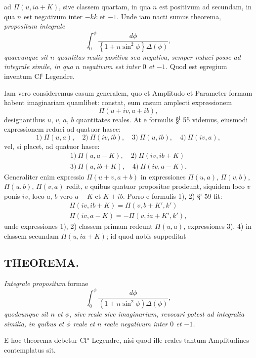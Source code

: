 \documentclass{article}
\begin{document}
ad $\Pi(u,ia+K)$, sive classem quartam, in qua $n$ est positivum ad secundam, in qua $n$ est negativum inter $-kk$ et $-1$. Unde iam nacti sumus theorema, \emph{propositum integrale}
\[
\int_{0}^{\phi}\frac{d\phi}{\left\{1+n\sin^{2}\phi\right\}\Delta(\phi)},
\]
\emph{quaecunque sit $n$ quantitas realis positiva seu negativa, semper reduci posse ad integrale simile, in quo $n$ negativum est inter $0$ et $-1$.} Quod est egregium inventum Cl$^{\mathrm{i}}$ Legendre.

Iam vero consideremus casum generalem, quo et Amplitudo et Parameter formam habent imaginariam quamlibet: constat, eum casum amplecti expressionem
\[
\Pi(u+iv,a+ib),
\]
designantibus $u$, $v$, $a$, $b$ quantitates reales. At e formulis §$^{\mathrm{i}}$ 55 videmus, eiusmodi expressionem reduci ad quatuor hasce:
\[
\text{1)}\ \Pi(u,a),\quad\text{2)}\ \Pi(iv,ib),\quad\text{3)}\ \Pi(u,ib),\quad\text{4)}\ \Pi(iv,a),
\]
vel, si placet, ad quatuor hasce:
\[
\begin{gathered}
\text{1)}\ \Pi(u,a-K),\quad\text{2)}\ \Pi(iv,ib+K)\\[1ex]
\text{3)}\ \Pi(u,ib+K),\quad\text{4)}\ \Pi(iv,a-K).
\end{gathered}
\]
Generaliter enim expressio $\Pi(u+v,a+b)$ in expressiones $\Pi(u,a)$, $\Pi(v,b)$, $\Pi(u,b)$, $\Pi(v,a)$ redit, e quibus quatuor propositae prodeunt, siquidem loco $v$ ponis $iv$, loco $a$, $b$ vero $a-K$ et $K+ib$. Porro e formulis 1), 2) §$^{\mathrm{i}}$ 59 fit:
\[
\begin{gathered}
\Pi(iv,ib+K)=\Pi(v,b+K',k')\\[1ex]
\Pi(iv,a-K)=-\Pi(v,ia+K',k'),
\end{gathered}
\]
unde expressiones 1), 2) classem primam  redeunt $\Pi(u,a)$, expressiones 3), 4) in classem secundam $\Pi(u,ia+K)$; id quod nobis suppeditat

\subsection*{THEOREMA.}

\emph{Integrale propositum} formae
\[
\int_{0}^{\phi}\frac{d\phi}{(1+n\sin^{2}\phi)\Delta(\phi)},
\]
\emph{quodcunque sit $n$ et $\phi$, sive reale sive imaginarium, revocari potest ad integralia similia, in quibus et $\phi$ reale et $n$ reale negativum inter $0$ et $-1$.}

E hoc theorema  debetur Cl$^{\mathrm{o}}$ Legendre, nisi quod ille reales tantum Amplitudines contemplatus sit.
\end{document}
